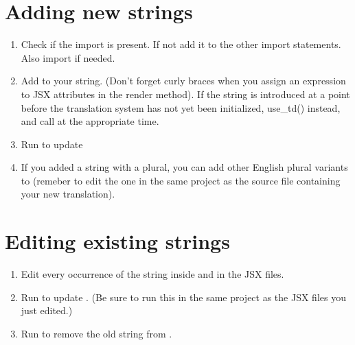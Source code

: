 \documentclass[letterpaper,10pt,openany,oneside,english]{sphinxmanual}
\begin{document}
\chapter{Adding new strings}
\label{\detokenize{translating-dev:adding-new-strings}}\begin{enumerate}
%
\item {} 
\sphinxAtStartPar
Check if the import  is present. If not add it to the other import statements. Also import  if needed.

\item {} 
\sphinxAtStartPar
Add  to your string. (Don’t forget curly braces when you assign an expression to JSX attributes in the render method). If the string is introduced at a point before the translation system has not yet been initialized, use\textasciigrave{}\textasciigrave{}\_td()\textasciigrave{} instead, and call  at the appropriate time.

\item {} 
\sphinxAtStartPar
Run  to update 

\item {} 
\sphinxAtStartPar
If you added a string with a plural, you can add other English plural variants to  (remeber to edit the one in the same project as the source file containing your new translation).

\end{enumerate}


\chapter{Editing existing strings}
\label{\detokenize{translating-dev:editing-existing-strings}}\begin{enumerate}
%
\item {} 
\sphinxAtStartPar
Edit every occurrence of the string inside  and  in the JSX files.

\item {} 
\sphinxAtStartPar
Run  to update . (Be sure to run this in the same project as the JSX files you just edited.)

\item {} 
\sphinxAtStartPar
Run  to remove the old string from .

\end{enumerate}
\end{document}

